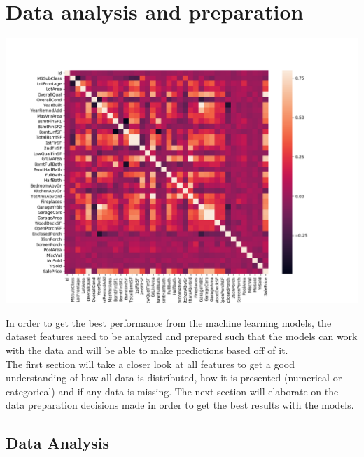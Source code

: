 \documentclass[a4paper,11pt]{article}
\begin{document}
\section{Data analysis and preparation}
\begin{minipage}{1\linewidth}
\includegraphics[width=\linewidth]{images/heatmap.png}
\end{minipage}

In order to get the best performance from the machine learning models, the dataset features need to be analyzed and prepared such that the models can work with the data and will be able to make predictions based off of it.\\
The first section will take a closer look at all features to get a good understanding of how all data is distributed, how it is presented (numerical or categorical) and if any data is missing. The next section will elaborate on the data preparation decisions made in order to get the best results with the models.



\subsection{Data Analysis}
\end{document}
